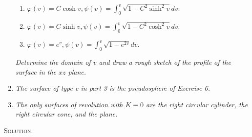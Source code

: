 \documentclass[a4paper]{article}
\numberwithin{equation}{section}
\begin{document}
\begin{enumerate}
\begin{enumerate}
\item $\varphi \left( v \right) = C\cosh v,\psi \left( v \right) = \int_0^v {\sqrt {1 - {C^2}{{\sinh }^2}v} dv} .$ 
\item $\varphi \left( v \right) = C\sinh v,\psi \left( v \right) = \int_0^v {\sqrt {1 - {C^2}{{\cosh }^2}v} dv} .$ 
\item $\varphi \left( v \right) = {e^v},\psi \left( v \right) = \int_0^v {\sqrt {1 - {e^{2v}}} dv} .$ 
\end{enumerate}
\textit{Determine the domain of $v$ and draw a rough sketch of the profile of the surface in the $xz$ plane.}
\item \textit{The surface of type c in part 3 is the pseudosphere of Exercise 6.}
\item \textit{The only surfaces of revolution with $K \equiv 0$ are the right circular cylinder, the right circular cone, and the plane.}
\end{enumerate}
\textsc{Solution.}
\end{document}
